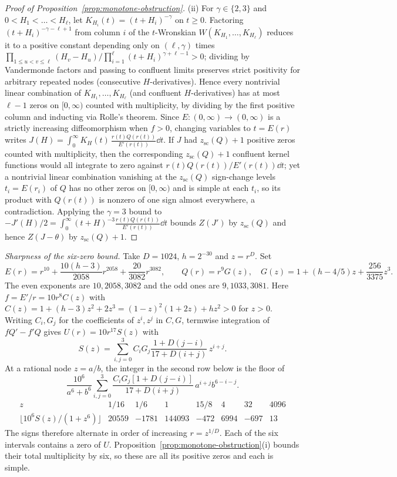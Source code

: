 \begin{proof}[Proof of Proposition~\ref{prop:monotone-obstruction}]
(ii) For $\gamma\in\{2,3\}$ and $0<H_1<\dots<H_\ell$, let $K_{H_i}(t)=(t+H_i)^{-\gamma}$ on $t\ge 0$.
Factoring $(t+H_i)^{-\gamma-\ell+1}$ from column $i$ of the $t$-Wronskian
$W(K_{H_1},\dots,K_{H_\ell})$ reduces it to a positive constant depending only on $(\ell,\gamma)$
times $\prod_{1\le u<v\le\ell}(H_v-H_u)/\prod_{i=1}^\ell(t+H_i)^{\gamma+\ell-1}>0$; dividing by
Vandermonde factors and passing to confluent limits preserves strict positivity for arbitrary repeated
nodes (consecutive $H$-derivatives). Hence every nontrivial linear combination of
$K_{H_1},\dots,K_{H_\ell}$ (and confluent $H$-derivatives) has at most $\ell-1$ zeros on $[0,\infty)$
counted with multiplicity, by dividing by the first positive column and inducting via Rolle's theorem.
Since $E:(0,\infty)\to(0,\infty)$ is a strictly increasing diffeomorphism when $f>0$, changing
variables to $t=E(r)$ writes $J(H)=\int_0^\infty K_H(t)\,\frac{r(t)Q(r(t))}{E'(r(t))}\dd t$. If $J$
had $z_{\mathrm{sc}}(Q)+1$ positive zeros counted with multiplicity, then the corresponding
$z_{\mathrm{sc}}(Q)+1$ confluent kernel functions would all integrate to zero against
$r(t)Q(r(t))/E'(r(t))\dd t$; yet a nontrivial linear combination vanishing at the $z_{\mathrm{sc}}(Q)$
sign-change levels $t_i=E(r_i)$ of $Q$ has no other zeros on $[0,\infty)$ and is simple at each $t_i$,
so its product with $Q(r(t))$ is nonzero of one sign almost everywhere, a contradiction. Applying the
$\gamma=3$ bound to $-J'(H)/2=\int_0^\infty (t+H)^{-3}\frac{r(t)Q(r(t))}{E'(r(t))}\dd t$ bounds
$Z(J')$ by $z_{\mathrm{sc}}(Q)$ and hence $Z(J-\theta)$ by $z_{\mathrm{sc}}(Q)+1$.
\end{proof}

\smallskip\noindent\emph{Sharpness of the six-zero bound.}
Take $D=1024$, $h=2^{-30}$ and $z=r^D$. Set
\[
 E(r)=r^{10}+\frac{10(h-3)}{2058}r^{2058}+\frac{20}{3082}r^{3082},
 \qquad Q(r)=r^9G(z),\quad
 G(z)=1+(h-4/5)z+\frac{256}{3375}z^3 .
\]
The even exponents are $10,2058,3082$ and the odd ones are $9,1033,3081$.
Here $f=E'/r=10r^8C(z)$ with
$C(z)=1+(h-3)z^2+2z^3=(1-z)^2(1+2z)+hz^2>0$ for $z>0$.
Writing $C_i,G_j$ for the coefficients of $z^i,z^j$ in $C,G$,
termwise integration of $fQ'-f'Q$ gives $U(r)=10r^{17}S(z)$ with
\[
 S(z)=\sum_{i,j=0}^3 C_iG_j
       \frac{1+D(j-i)}{17+D(i+j)}\,z^{i+j}.
\]
At a rational node $z=a/b$, the integer in the second row below is
the floor of
\[
 \frac{10^6}{a^6+b^6}\sum_{i,j=0}^3
 \frac{C_iG_j[1+D(j-i)]}{17+D(i+j)}\,a^{i+j}b^{6-i-j}.
\]
\[
\begin{array}{c|rrrrrrr}
z&1/16&1/6&1&15/8&4&32&4096\\
\lfloor 10^6 S(z)/(1+z^6)\rfloor&20559&-1781&144093&-472&6994&-697&13
\end{array}
\]
The signs therefore alternate in order of increasing $r=z^{1/D}$.
Each of the six intervals contains a zero of $U$. Proposition~\ref{prop:monotone-obstruction}(i)
bounds their total multiplicity by six, so these are all its positive
zeros and each is simple.

